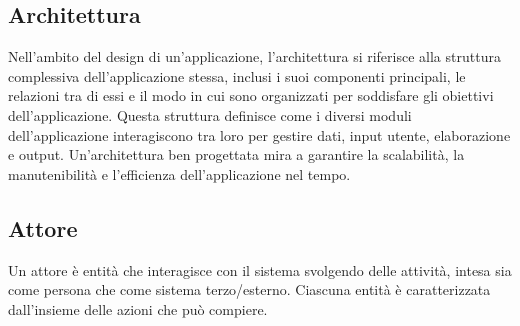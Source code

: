 \subsection{Architettura} 
Nell'ambito del design di un'applicazione, l'architettura si riferisce alla struttura complessiva dell'applicazione stessa, inclusi i suoi componenti principali, le relazioni tra di essi e il modo in cui sono organizzati per soddisfare gli obiettivi dell'applicazione. Questa struttura definisce come i diversi moduli dell'applicazione interagiscono tra loro per gestire dati, input utente, elaborazione e output. Un'architettura ben progettata mira a garantire la scalabilità, la manutenibilità e l'efficienza dell'applicazione nel tempo.
\subsection{Attore} 
Un attore è entità che interagisce con il sistema svolgendo delle attività, intesa sia come persona che come sistema terzo/esterno. Ciascuna entità è caratterizzata dall’insieme delle azioni che può compiere.
